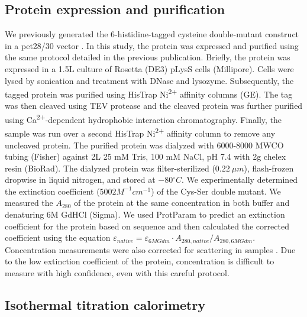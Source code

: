 \subsection{Protein expression and purification}

We previously generated the 6-histidine-tagged cysteine double-mutant
construct in a pet28/30 vector \cite{wheeler_multiple_2016}. In
this study, the protein was expressed and purified using the same
protocol detailed in the previous publication. Briefly, the protein
was expressed in a 1.5L culture of Rosetta (DE3) pLysS cells (Millipore).
Cells were lysed by sonication and treatment with DNase and lysozyme.
Subsequently, the tagged protein was purified using HisTrap Ni\textsuperscript{2+} affinity
columns (GE). The tag was then cleaved using TEV protease and the
cleaved protein was further purified using Ca\textsuperscript{2+}-dependent
hydrophobic interaction chromatography. Finally, the sample was run
over a second HisTrap Ni\textsuperscript{2+} affinity column to remove
any uncleaved protein. The purified protein was dialyzed with 6000-8000
MWCO tubing (Fisher) against 2L 25 mM Tris, 100 mM NaCl, pH 7.4 with
2g chelex resin (BioRad). The dialyzed protein was filter-sterilized
($0.22\ \mu m$), flash-frozen dropwise in liquid nitrogen, and stored
at $-80{^\circ}C$. We experimentally determined the extinction coefficient
($5002M^{-1}cm^{-1}$) of the Cys-Ser double mutant. We measured the
$A_{280}$ of the protein at the same concentration in both buffer
and denaturing 6M GdHCl (Sigma). We used ProtParam \cite{gill_calculation_1989}
to predict an extinction coefficient for the protein based on sequence
and then calculated the corrected coefficient using the equation $\varepsilon_{native}=\varepsilon_{6MGdm}\cdot A_{280,native}/A_{280,6MGdm}$.
Concentration measurements were also corrected for scattering in samples
\cite{birdsall_correction_1983}. Due to the low extinction coefficient
of the protein, concentration is difficult to measure with high confidence,
even with this careful protocol.

\subsection{Isothermal titration calorimetry}

